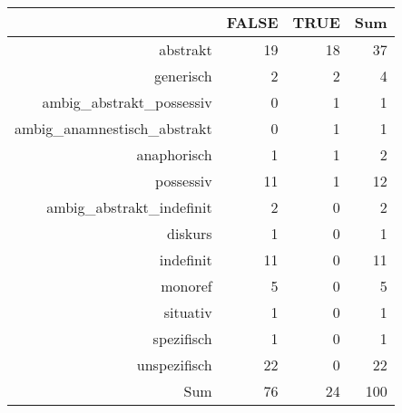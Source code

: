 \begin{tabular}{rrrr}
  \hline
 & FALSE & TRUE & Sum \\ 
  \hline
abstrakt & 19 & 18 & 37 \\ 
  generisch & 2 & 2 & 4 \\ 
  ambig\_abstrakt\_possessiv & 0 & 1 & 1 \\ 
  ambig\_anamnestisch\_abstrakt & 0 & 1 & 1 \\ 
  anaphorisch & 1 & 1 & 2 \\ 
  possessiv & 11 & 1 & 12 \\ 
  ambig\_abstrakt\_indefinit & 2 & 0 & 2 \\ 
  diskurs & 1 & 0 & 1 \\ 
  indefinit & 11 & 0 & 11 \\ 
  monoref & 5 & 0 & 5 \\ 
  situativ & 1 & 0 & 1 \\ 
  spezifisch & 1 & 0 & 1 \\ 
  unspezifisch & 22 & 0 & 22 \\ 
  Sum & 76 & 24 & 100 \\ 
   \hline
\end{tabular}
